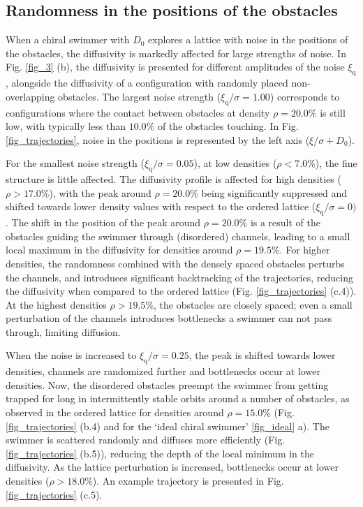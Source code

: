 \documentclass[aps,pre,twocolumn,showpacs,superscriptaddress,amsmath,amssymb,longbibliography]{revtex4-2}
\begin{document}
\subsection{Randomness in the positions of the obstacles}\label{posnoise}
When a chiral swimmer with $D_{\textrm{0}}$ explores a lattice with noise in the positions of the obstacles, the diffusivity is markedly affected for large strengths of noise. In Fig. \ref{fig_3} (b), the diffusivity is presented for different amplitudes of the noise $\xi_{\textrm{q}}$, alongside the diffusivity of a configuration with randomly placed non-overlapping obstacles. The largest noise strength ($\xi_{\textrm{q}}/\sigma = 1.00$) corresponds to configurations where the contact between obstacles at density $\rho=20.0 \%$ is still low, with typically less than $10.0 \%$ of the obstacles touching. In Fig. \ref{fig_trajectories}, noise in the positions is represented by the left axis ($\xi/\sigma + D_{\textrm{0}}$).

For the smallest noise strength ($\xi_{\textrm{q}}/\sigma=0.05$), at low densities ($\rho < 7.0 \% $), the fine structure is little affected. The diffusivity profile is affected for high densities ($\rho > 17.0 \% $), with the peak around $\rho = 20.0 \%$ being significantly suppressed and shifted towards lower density values with respect to the ordered lattice ($\xi_{\textrm{q}}/\sigma=0)$. The shift in the position of the peak around $\rho = 20.0 \%$ is a result of the obstacles guiding the swimmer through (disordered) channels, leading to a small local maximum in the diffusivity for densities around $\rho = 19.5 \%$. For higher densities, the randomness combined with the densely spaced obstacles perturbs the channels, and introduces significant backtracking of the trajectories, reducing the diffusivity when compared to the ordered lattice (Fig. \ref{fig_trajectories} (c.4)). At the highest densities $\rho > 19.5 \%$, the obstacles are closely spaced; even a small perturbation of the channels introduces bottlenecks a swimmer can not pass through, limiting diffusion.

When the noise is increased to $\xi_{\textrm{q}}/\sigma = 0.25$, the peak is shifted towards lower densities, channels are randomized further and bottlenecks occur at lower densities. Now, the disordered obstacles preempt the swimmer from getting trapped for long in intermittently stable orbits around a number of obstacles, as observed in the ordered lattice for densities around $\rho = 15.0 \%$ (Fig. \ref{fig_trajectories} (b.4) and for the `ideal chiral swimmer' \ref{fig_ideal} a). The swimmer is scattered randomly and diffuses more efficiently (Fig. \ref{fig_trajectories} (b.5)), reducing the depth of the local minimum in the diffusivity. As the lattice perturbation is increased, bottlenecks occur at lower densities ($\rho > 18.0 \%$). An example trajectory is presented in Fig. \ref{fig_trajectories} (c.5). 
\end{document}
